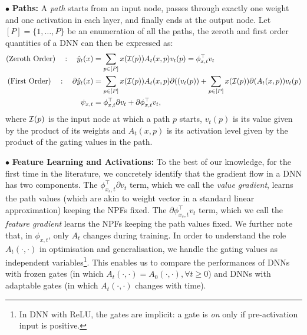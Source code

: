 \documentclass{article}
\begin{document}
$\bullet$ \textbf{Paths:}  A \emph{path} starts from an input node, passes through exactly one weight and one activation in each layer, and finally ends at the output node. Let $[P]=\{1,\ldots,P\}$ be an enumeration of all the paths, the zeroth and first order quantities of a DNN can then be expressed as:
\begin{align*}
\text{(Zeroth Order)}\quad: \quad \hat{y}_t(x)&=\sum_{p\in [P]}x(\mathcal{I}(p))A_t(x,p)v_t(p)={\phi^\top_{x,t}} v_t\\
\text{(First Order)}\quad: \quad \partial \hat{y}_t(x)&= \sum_{p\in [P]}x(\mathcal{I}(p)) A_t(x,p) \partial((v_t(p))+\sum_{p\in [P]}x(\mathcal{I}(p)) \partial(A_t(x,p)) v_t(p)\\
\psi_{x,t}&=\phi^\top_{x,t} {\partial} v_t + {\partial} \phi^\top_{x,t} v_t,
\end{align*}
where $\mathcal{I}(p)$ is the input node at which a path $p$ starts, $v_t(p)$ is its value given by the product of its weights and $A_t(x,p)$ is its activation level given by the product of the gating values in the path. 

$\bullet$ \textbf{Feature Learning and Activations:} To the best of our knowledge, for the first time in the literature, we concretely identify that the gradient flow in a DNN has two components. The $\phi^\top_{x_s,t} {\partial} v_t $ term, which we call the \emph{value gradient}, learns the path values (which are akin to weight vector in a standard linear approximation) keeping the NPFs fixed. The $ {\partial} \phi^\top_{x_s,t} v_t$ term, which we call the \emph{feature gradient} learns the NPFs keeping the path values fixed. We further note that, in $\phi_{x,t}$, only $A_t$ changes during training. In order to understand the role $A_t(\cdot,\cdot)$ in optimisation and generalisation, we handle the gating values as independent variables\footnote{In DNN with ReLU, the gates are implicit: a gate is \emph{on} only if pre-activation input is positive.}. This  enables us to compare the performances of DNNs with frozen gates (in which $A_t(\cdot,\cdot)=A_0(\cdot,\cdot),\forall t\geq 0$) and DNNs with adaptable gates (in which $A_t(\cdot,\cdot)$ changes with time).
\end{document}
